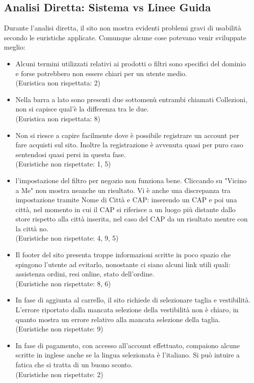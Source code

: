 \documentclass[12pt,a4paper]{report}
\begin{document}
\subsection{Analisi Diretta: Sistema vs Linee Guida}
Durante l'analisi diretta, il sito non mostra evidenti problemi gravi di usabilità secondo le euristiche applicate. Comunque alcune cose potevano venir sviluppate meglio:
\begin{itemize}
  \item Alcuni termini utilizzati relativi ai prodotti o filtri sono specifici del dominio e forse potrebbero non essere chiari per un utente medio.\\
  (Euristica non rispettata: 2)
  \item Nella barra a lato sono presenti due sottomenù entrambi chiamati Collezioni, non si capisce qual'è la differenza tra le due.\\
  (Euristica non rispettata: 8)
  \item Non si riesce a capire facilmente dove è possibile registrare un account per fare acquisti sul sito. Inoltre la registrazione è avvenuta quasi per puro caso sentendosi quasi persi in questa fase.\\
  (Euristiche non rispettate: 1, 5)
  \item l'impostazione del filtro per negozio non funziona bene. Cliccando su "Vicino a Me" non mostra neanche un risultato. Vi è anche una discrepanza tra impostazione tramite Nome di Città e CAP: inserendo un CAP e poi una città, nel momento in cui il CAP si riferisce a un luogo più distante dallo store rispetto alla città inserita, nel caso del CAP da un risultato mentre con la città no.\\
  (Euristiche non rispettate: 4, 9, 5)
  \item Il footer del sito presenta troppe informazioni scritte in poco spazio che spingono l'utente ad evitarlo, nonostante ci siano alcuni link utili quali: assistenza ordini, resi online, stato dell'ordine.\\
  (Euristiche non rispettate: 8, 6)
  \item In fase di aggiunta al carrello, il sito richiede di selezionare taglia e vestibilità. L'errore riportato dalla mancata selezione della vestibilità non è chiaro, in quanto mostra un errore relativo alla mancata selezione della taglia.\\
  (Euristiche non rispettate: 9)
  \item In fase di pagamento, con accesso all'account effettuato, compaiono alcune scritte in inglese anche se la lingua selezionata è l'italiano. Si può intuire a fatica che si tratta di un buono sconto.\\
  (Euristiche non rispettate: 2)
\end{itemize}
\end{document}

